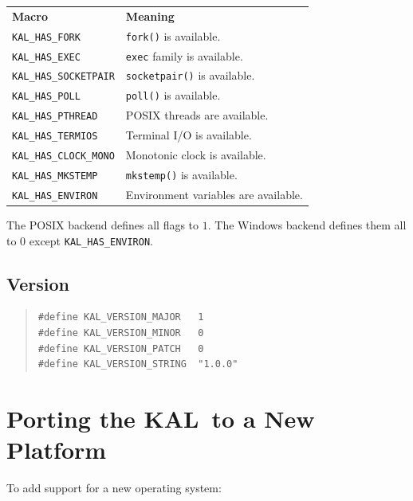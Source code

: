 \documentclass[11pt,twoside]{article}
\newcommand{\KAL}{KAL}
\begin{document}
\bigskip
\noindent
\begin{tabularx}{\textwidth}{lX}
{\bf Macro} & {\bf Meaning} \\[2pt]
{\tt KAL\_HAS\_FORK}       & {\tt fork()} is available. \\
{\tt KAL\_HAS\_EXEC}       & {\tt exec} family is available. \\
{\tt KAL\_HAS\_SOCKETPAIR} & {\tt socketpair()} is available. \\
{\tt KAL\_HAS\_POLL}       & {\tt poll()} is available. \\
{\tt KAL\_HAS\_PTHREAD}    & POSIX threads are available. \\
{\tt KAL\_HAS\_TERMIOS}    & Terminal I/O is available. \\
{\tt KAL\_HAS\_CLOCK\_MONO} & Monotonic clock is available. \\
{\tt KAL\_HAS\_MKSTEMP}    & {\tt mkstemp()} is available. \\
{\tt KAL\_HAS\_ENVIRON}    & Environment variables are available. \\
\end{tabularx}

The POSIX backend defines all flags to $1$.  The Windows backend
defines them all to $0$ except {\tt KAL\_HAS\_ENVIRON}.

\subsection{Version}

\begin{quote}
\begin{verbatim}
#define KAL_VERSION_MAJOR   1
#define KAL_VERSION_MINOR   0
#define KAL_VERSION_PATCH   0
#define KAL_VERSION_STRING  "1.0.0"
\end{verbatim}
\end{quote}

\newpage
\section{Porting the \KAL\ to a New Platform}
\label{sec:porting}

To add support for a new operating system:
\end{document}
